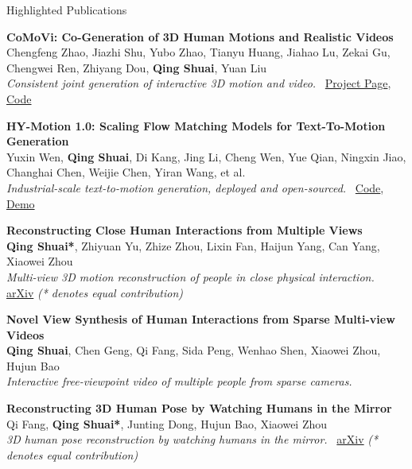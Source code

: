 \documentclass{resume}
\begin{document}
\begin{rSection}{Highlighted Publications}

    {\bf CoMoVi: Co-Generation of 3D Human Motions and Realistic Videos}\hfill{ } \\
    Chengfeng Zhao, Jiazhi Shu, Yubo Zhao, Tianyu Huang, Jiahao Lu, Zekai Gu, Chengwei Ren, Zhiyang Dou, \textbf{Qing Shuai}, Yuan Liu\\
    \emph{Consistent joint generation of interactive 3D motion and video.} \, \href{https://igl-hkust.github.io/CoMoVi/}{Project Page}, \href{https://github.com/IGL-HKUST/CoMoVi}{Code}

    {\bf HY-Motion 1.0: Scaling Flow Matching Models for Text-To-Motion Generation}\hfill{ } \\
    Yuxin Wen, \textbf{Qing Shuai}, Di Kang, Jing Li, Cheng Wen, Yue Qian, Ningxin Jiao, Changhai Chen, Weijie Chen, Yiran Wang, et al.\\
    \emph{Industrial-scale text-to-motion generation, deployed and open-sourced.} \, \href{https://github.com/Tencent-Hunyuan/HY-Motion-1.0}{Code}, \href{https://huggingface.co/spaces/tencent/HY-Motion-1.0}{Demo}

    {\bf Reconstructing Close Human Interactions from Multiple Views}\hfill{ } \\
    \textbf{Qing Shuai*}, Zhiyuan Yu, Zhize Zhou, Lixin Fan, Haijun Yang, Can Yang, Xiaowei Zhou\\
    \emph{Multi-view 3D motion reconstruction of people in close physical interaction.} \, \href{https://arxiv.org/abs/2401.16173}{arXiv} {\em (* denotes equal contribution)}

    {\bf Novel View Synthesis of Human Interactions from Sparse Multi-view Videos}\hfill{ } \\
    \textbf{Qing Shuai}, Chen Geng, Qi Fang, Sida Peng, Wenhao Shen, Xiaowei Zhou, Hujun Bao\\
    \emph{Interactive free-viewpoint video of multiple people from sparse cameras.}

    {\bf Reconstructing 3D Human Pose by Watching Humans in the Mirror}\hfill{ } \\
    Qi Fang, \textbf{Qing Shuai*}, Junting Dong, Hujun Bao, Xiaowei Zhou\\
    \emph{3D human pose reconstruction by watching humans in the mirror.} \, \href{https://arxiv.org/abs/2104.00340}{arXiv} {\em (* denotes equal contribution)}


\end{rSection}
\end{document}
